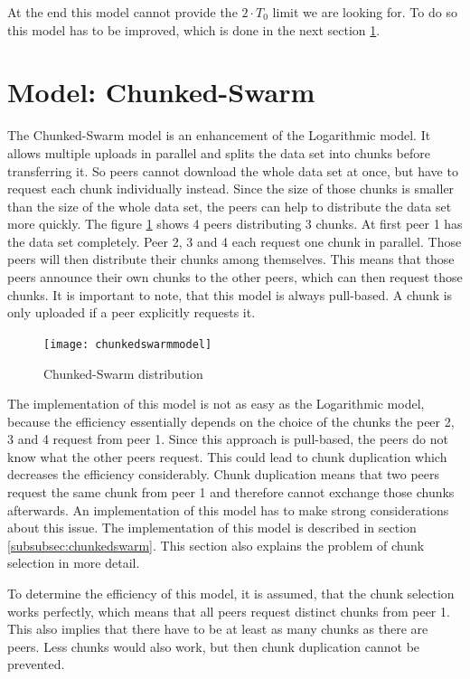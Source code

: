 At the end this model cannot provide the $2 \cdot T_0$ limit we are looking for. To do so this model has to be improved, which is done in the next section \ref{sec:chunkedswarmmodel}.


\section{Model: Chunked-Swarm}
\label{sec:chunkedswarmmodel}
The Chunked-Swarm model is an enhancement of the Logarithmic model. It allows multiple uploads in parallel and splits the data set into chunks before transferring it. So peers cannot download the whole data set at once, but have to request each chunk individually instead. Since the size of those chunks is smaller than the size of the whole data set, the peers can help to distribute the data set more quickly. The figure \ref{fig:chunkedswarmmodel} shows 4 peers distributing 3 chunks. At first peer 1 has the data set completely. Peer 2, 3 and 4 each request one chunk in parallel. Those peers will then distribute their chunks among themselves. This means that those peers announce their own chunks to the other peers, which can then request those chunks. It is important to note, that this model is always pull-based. A chunk is only uploaded if a peer explicitly requests it.

\begin{figure}[H]
\centering
\texttt{[image: chunkedswarmmodel]}
\caption{Chunked-Swarm distribution}
\label{fig:chunkedswarmmodel}
\end{figure}

The implementation of this model is not as easy as the Logarithmic model, because the efficiency essentially depends on the choice of the chunks the peer 2, 3 and 4 request from peer 1. Since this approach is pull-based, the peers do not know what the other peers request. This could lead to chunk duplication which decreases the efficiency considerably. Chunk duplication means that two peers request the same chunk from peer 1 and therefore cannot exchange those chunks afterwards. An implementation of this model has to make strong considerations about this issue. The implementation of this model is described in section \ref{subsubsec:chunkedswarm}. This section also explains the problem of chunk selection in more detail.

To determine the efficiency of this model, it is assumed, that the chunk selection works perfectly, which means that all peers request distinct chunks from peer 1. This also implies that there have to be at least as many chunks as there are peers. Less chunks would also work, but then chunk duplication cannot be prevented.

